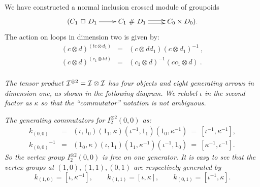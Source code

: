 \noindent
We have constructed a normal inclusion crossed module of groupoids 
$$
\xymatrix{
(C_1\ \Box\ D_1 \ar[r] 
  &  C_1\ \#\ D_1 \ar[r]<+0.5ex>\ar[r]<-0.5ex>
     &  C_0 \times D_0).  
}$$
The action on loops in dimension two is given by: 
\begin{eqnarray*}
(c \otimes d)^{(tc \otimes d_1)} &=& (c \otimes dd_1)(c \otimes d_1)^{-1}\ ,\\
(c \otimes d)^{(c_1 \otimes td)} &=& (c_1 \otimes d)^{-1}(cc_1 \otimes d)\ .\\
\end{eqnarray*}

\bigskip
\begin{example} \label{ex:itensori}
\emph{The tensor product $\mathcal{I}^{\otimes 2} = \mathcal{I}\otimes\mathcal{I}$ 
has four objects and eight generating arrows in dimension one, 
as shown in the following diagram. 
We relabel $\iota$ in the second factor as $\kappa$ 
so that the ``commutator'' notation is not ambiguous.} 

\begin{figure}[htbp]
\begin{center}

\label{figure:itensori}
\end{center}
\end{figure}

\emph{The generating commutators for $I^{\otimes 2}_2(0,0)$ as:} 
\begin{eqnarray*}
k_{(0,0)} 
  &=& (\iota,1_0)(1_1,\kappa)(\iota^{-1},1_1)(1_0,\kappa^{-1}) 
  ~=~ [\iota^{-1}, \kappa^{-1}], \\ 
{k_{(0,0)}}^{-1} 
  &=& (1_0,\kappa)(\iota,1_1)(1_1,\kappa^{-1})(\iota^{-1},1_0) 
  ~=~ [\kappa^{-1},\iota^{-1}]. 
\end{eqnarray*} 
\emph{So the vertex group $I^{\otimes 2}_2(0,0)$ is free on one generator. 
It is easy to see that the vertex groups at 
$(1,0), (1,1), (0,1)$ are respectively generated by} 
$$
k_{(1,0)} = [\iota, \kappa^{-1}], \qquad
k_{(1,1)} = [\iota, \kappa], \qquad
k_{(0,1)} = [\iota^{-1}, \kappa]. 
$$
\end{example}

